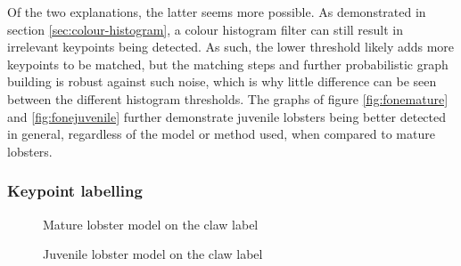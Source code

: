 Of the two explanations, the latter seems more possible. As demonstrated in section \ref{sec:colour-histogram}, a colour histogram filter can still result in irrelevant keypoints being detected. As such, the lower threshold likely adds more keypoints to be matched, but the matching steps and further probabilistic graph building is robust against such noise, which is why little difference can be seen between the different histogram thresholds. 
\n
The graphs of figure \ref{fig:fonemature} and \ref{fig:fonejuvenile} further demonstrate juvenile lobsters being better detected in general, regardless of the model or method used, when compared to mature lobsters. 
\subsubsection{Keypoint labelling}

\newcommand{\fonelabelplot}[6] {
\addplot+[
	discard if not={Method}{#1},
	discard if not={Model}{#2},
	discard if not={Category}{#3},
	discard if not={HistThreshold}{#4},
	discard if not={Label}{#5}
] table [x=LabelThreshold, y=F1, col sep=comma] {\resultspath/kp-labelling.csv};
\addlegendentry{#6}
}

\newcommand{\fonelabelgraph}[4]{
\begin{tikzpicture}[scale=0.75]
\begin{axis}[
	title = {\textbf{Histogram threshold of #2}},
	legend pos=outer north east,
	legend entries={
		Graph method on mature lobsters;,
		Label method on mature lobsters;,
		Graph method on juvenile lobsters;,
		Label method on juvenile lobsters
	},
	legend to name=#4,
	xlabel={Label threshold},
	xmin=0,xmax=1,
	ylabel={F1 score},
	ymin=0,ymax=1
]

\fonelabelplot{graph}{#1}{mature}{#2}{#3}{Graph method on mature lobsters}
\fonelabelplot{model}{#1}{mature}{#2}{#3}{Label method on mature lobsters}
\fonelabelplot{graph}{#1}{juvenile}{#2}{#3}{Graph method on juvenile lobsters}
\fonelabelplot{model}{#1}{juvenile}{#2}{#3}{Label method on juvenile lobsters}
\end{axis}
\end{tikzpicture}
}

\begin{figure}[H]
\centering
{}
\caption{Mature lobster model on the claw label}
\end{figure}


\begin{figure}[H]
\centering
{}
\caption{Juvenile lobster model on the claw label}
\end{figure}



